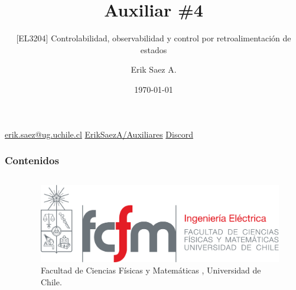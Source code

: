 \documentclass[
    10pt,
    aspectratio=169,
    xcolor={dvipsnames},
    spanish,
    ]{beamer}
\title[Auxiliar \#4]{\bfseries Auxiliar \#4}
\subtitle{[EL3204] Controlabilidad, observabilidad y control por retroalimentación de estados}
\author[Erik Saez A.]{Erik Saez A.}
\institute[UChile]{Department of Electrical Engineering \\ Universidad de Chile}
\date{\today}
\begin{document}
\begin{frame}
  \titlepage
  \centering
   \href{mailto:erik.saez@ug.uchile.cl}{erik.saez@ug.uchile.cl} \hspace{.2cm}
   \href{https://github.com/ErikSaezA/Auxiliares}{ErikSaezA/Auxiliares} \hspace{.2cm}
   \href{https://discord.gg/ubthV3cudQ}{Discord}
\end{frame}

\begin{frame}
  \frametitle{Contenidos}
  \centering
  \begin{columns}
    \begin{column}{0.4\textwidth}
      \tableofcontents
    \end{column}
    \begin{column}{0.5\textwidth}
      \begin{figure}
        \centering
        \includegraphics[width=\textwidth]{fcfm_die}
        \caption{Facultad de Ciencias Físicas y Matemáticas , Universidad de Chile.}
      \end{figure}
    \end{column}
  \end{columns}  
\end{frame}
\end{document}

